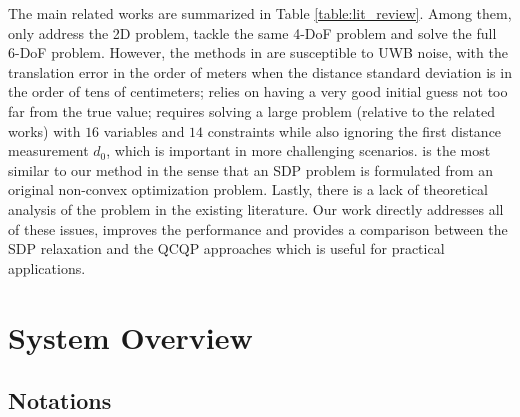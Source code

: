 \documentclass[journal]{IEEEtran}
\begin{document}
The main related works are summarized in Table \ref{table:lit_review}. Among them, \cite{shariati2016recovering,li2020relSDP} only address the 2D problem, \cite{molina2019unique, ziegler2021distributed} tackle the same 4-DoF problem and \cite{jiang2020rel3D, trawny2010rel3Dtransform} solve the full 6-DoF problem.
However, the methods in \cite{molina2019unique, trawny2010rel3Dtransform} are susceptible to UWB noise, with the translation error in the order of meters when the distance standard deviation is in the order of tens of centimeters; \cite{ziegler2021distributed} relies on having a very good initial guess not too far from the true value; \cite{jiang2020rel3D} requires solving a large problem (relative to the related works) with $16$ variables and $14$ constraints while also ignoring the first distance measurement $d_0$, which is important in more challenging scenarios.
\cite{jiang2020rel3D} is the most similar to our method in the sense that an SDP problem is formulated from an original non-convex optimization problem. Lastly, there is a lack of theoretical analysis of the problem in the existing literature. Our work directly addresses all of these issues, improves the performance and provides a comparison between the SDP relaxation and the QCQP approaches which is useful for practical applications.


\section{System Overview} \label{sec:sys_overview}


\subsection{Notations} \label{subsec:notations}
\end{document}
